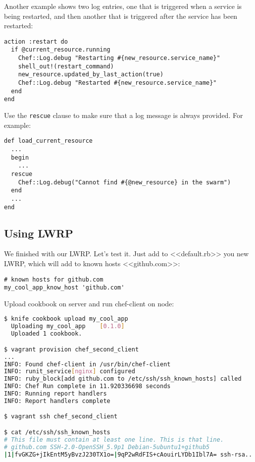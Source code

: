 Another example shows two log entries, one that is triggered when a service is being restarted, and then another that is triggered after the service has been restarted:

\begin{lstlisting}[label=lst:cookbook-lwrp-logs3]
action :restart do
  if @current_resource.running
    Chef::Log.debug "Restarting #{new_resource.service_name}"
    shell_out!(restart_command)
    new_resource.updated_by_last_action(true)
    Chef::Log.debug "Restarted #{new_resource.service_name}"
  end
end
\end{lstlisting}

Use the \lstinline!rescue! clause to make sure that a log message is always provided. For example:

\begin{lstlisting}[label=lst:cookbook-lwrp-logs4]
def load_current_resource
  ...
  begin
    ...
  rescue
    Chef::Log.debug("Cannot find #{@new_resource} in the swarm")
  end
  ...
end
\end{lstlisting}

\subsection{Using LWRP}

We finished with our LWRP. Let's test it. Just add to <<default.rb>> you new LWRP, which will add to known hosts <<github.com>>:

\begin{lstlisting}[label=lst:cookbook-lwrp5,title=my-server-cloud/site-cookbooks/my\_cool\_app/recipes/default.rb]
# known hosts for github.com
my_cool_app_know_host 'github.com'
\end{lstlisting}

Upload cookbook on server and run chef-client on node:

\begin{lstlisting}[language=Bash,label=lst:cookbook-lwrp6]
$ knife cookbook upload my_cool_app
  Uploading my_cool_app    [0.1.0]
  Uploaded 1 cookbook.

$ vagrant provision chef_second_client
...
INFO: Found chef-client in /usr/bin/chef-client
INFO: runit_service[nginx] configured
INFO: ruby_block[add github.com to /etc/ssh/ssh_known_hosts] called
INFO: Chef Run complete in 11.920336698 seconds
INFO: Running report handlers
INFO: Report handlers complete

$ vagrant ssh chef_second_client

$ cat /etc/ssh/ssh_known_hosts
# This file must contain at least one line. This is that line.
# github.com SSH-2.0-OpenSSH_5.9p1 Debian-5ubuntu1+github5
|1|fvGKZG+jIkEntM5yBvzJ230TX1o=|9qP2wRdFIS+cAouirLYDb1Ibl7A= ssh-rsa...
\end{lstlisting}

